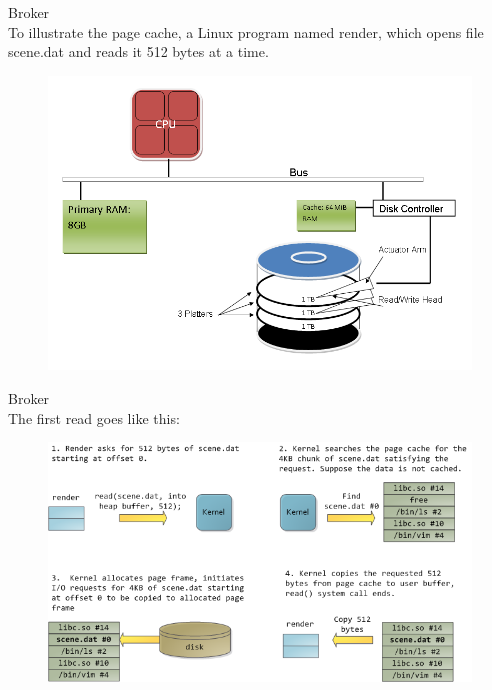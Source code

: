 \begin{frame}[plain,t]{Broker} %
     \\
    \vspace{2ex}
     To illustrate the page cache, a Linux program named render, which opens file scene.dat and reads it 512 bytes at a time. 
    
    \begin{figure}
        \centering
        \includegraphics[width=0.7\linewidth]{image/0214}
        \label{fig:0214}
    \end{figure}
    
\end{frame}
\begin{frame}[plain,t]{Broker} %
     \\
    \vspace{2ex}
    The first read goes like this:
    \begin{figure}
        \centering
        \includegraphics[width=0.9\linewidth]{image/0215}
        \label{fig:0215}
    \end{figure}
    
\end{frame}

